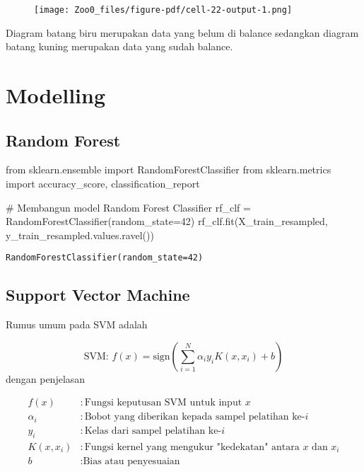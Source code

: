 \documentclass[
  letterpaper,
]{krantz}
\makeatletter
\newenvironment{Shaded}{\begin{snugshade}}{\end{snugshade}}
\newcommand{\CommentTok}[1]{\textcolor[rgb]{0.37,0.37,0.37}{#1}}
\newcommand{\DecValTok}[1]{\textcolor[rgb]{0.68,0.00,0.00}{#1}}
\newcommand{\ImportTok}[1]{\textcolor[rgb]{0.00,0.46,0.62}{#1}}
\newcommand{\NormalTok}[1]{\textcolor[rgb]{0.00,0.23,0.31}{#1}}
\newcommand{\OperatorTok}[1]{\textcolor[rgb]{0.37,0.37,0.37}{#1}}
\newenvironment{kframe}{%
\medskip{}
\setlength{\fboxsep}{.8em}
 \def\at@end@of@kframe{}%
 \ifinner\ifhmode%
  \def\at@end@of@kframe{\end{minipage}}%
  \begin{minipage}{\columnwidth}%
 \fi\fi%
 \def\FrameCommand##1{\hskip\@totalleftmargin \hskip-\fboxsep
 \colorbox{shadecolor}{##1}\hskip-\fboxsep
     \hskip-\linewidth \hskip-\@totalleftmargin \hskip\columnwidth}%
 \MakeFramed {\advance\hsize-\width
   \@totalleftmargin\z@ \linewidth\hsize
   \@setminipage}}%
 {\par\unskip\endMakeFramed%
 \at@end@of@kframe}
\renewenvironment{Shaded}{\begin{kframe}}{\end{kframe}}
\makeatother
\begin{document}
\begin{figure}[H]

{\centering \texttt{[image: Zoo0\_files/figure-pdf/cell-22-output-1.png]}

}

\end{figure}

Diagram batang biru merupakan data yang belum di balance sedangkan
diagram batang kuning merupakan data yang sudah balance.

\hypertarget{modelling}{%
\section{Modelling}\label{modelling}}

\hypertarget{random-forest}{%
\subsection{Random Forest}\label{random-forest}}

\begin{Shaded}
\begin{Highlighting}[]
\ImportTok{from}\NormalTok{ sklearn.ensemble }\ImportTok{import}\NormalTok{ RandomForestClassifier}
\ImportTok{from}\NormalTok{ sklearn.metrics }\ImportTok{import}\NormalTok{ accuracy\_score, classification\_report}


\CommentTok{\# Membangun model Random Forest Classifier}
\NormalTok{rf\_clf }\OperatorTok{=}\NormalTok{ RandomForestClassifier(random\_state}\OperatorTok{=}\DecValTok{42}\NormalTok{)}
\NormalTok{rf\_clf.fit(X\_train\_resampled, y\_train\_resampled.values.ravel())}
\end{Highlighting}
\end{Shaded}

\begin{verbatim}
RandomForestClassifier(random_state=42)
\end{verbatim}

\hypertarget{support-vector-machine}{%
\subsection{Support Vector Machine}\label{support-vector-machine}}

Rumus umum pada SVM adalah

\[\text{SVM: } f(x) = \text{sign}\left(\sum_{i=1}^{N} \alpha_i y_i K(x, x_i) + b\right)\]
dengan penjelasan

\begin{align*}
f(x) & : \text{Fungsi keputusan SVM untuk input } x \\
\alpha_i & : \text{Bobot yang diberikan kepada sampel pelatihan ke-} i \\
y_i & : \text{Kelas dari sampel pelatihan ke-} i \\
K(x, x_i) & : \text{Fungsi kernel yang mengukur "kedekatan" antara } x \text{ dan } x_i \\
b & : \text{Bias atau penyesuaian}
\end{align*}
\end{document}
